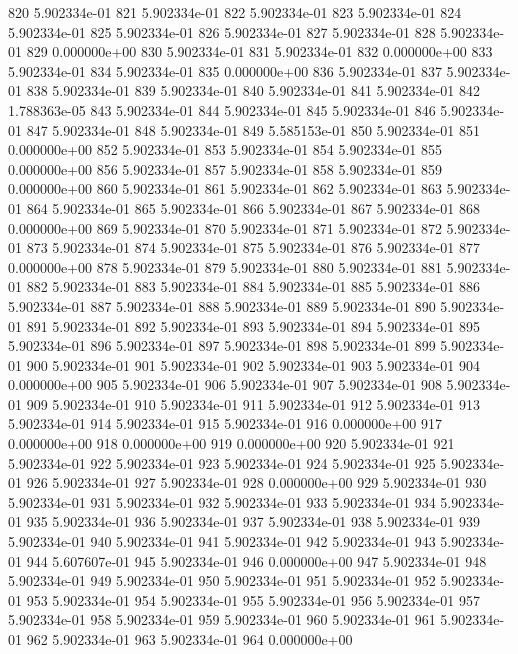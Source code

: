 \documentclass{article}
\begin{document}
\begin{Schunk}
\begin{Soutput}
820  5.902334e-01
821  5.902334e-01
822  5.902334e-01
823  5.902334e-01
824  5.902334e-01
825  5.902334e-01
826  5.902334e-01
827  5.902334e-01
828  5.902334e-01
829  0.000000e+00
830  5.902334e-01
831  5.902334e-01
832  0.000000e+00
833  5.902334e-01
834  5.902334e-01
835  0.000000e+00
836  5.902334e-01
837  5.902334e-01
838  5.902334e-01
839  5.902334e-01
840  5.902334e-01
841  5.902334e-01
842  1.788363e-05
843  5.902334e-01
844  5.902334e-01
845  5.902334e-01
846  5.902334e-01
847  5.902334e-01
848  5.902334e-01
849  5.585153e-01
850  5.902334e-01
851  0.000000e+00
852  5.902334e-01
853  5.902334e-01
854  5.902334e-01
855  0.000000e+00
856  5.902334e-01
857  5.902334e-01
858  5.902334e-01
859  0.000000e+00
860  5.902334e-01
861  5.902334e-01
862  5.902334e-01
863  5.902334e-01
864  5.902334e-01
865  5.902334e-01
866  5.902334e-01
867  5.902334e-01
868  0.000000e+00
869  5.902334e-01
870  5.902334e-01
871  5.902334e-01
872  5.902334e-01
873  5.902334e-01
874  5.902334e-01
875  5.902334e-01
876  5.902334e-01
877  0.000000e+00
878  5.902334e-01
879  5.902334e-01
880  5.902334e-01
881  5.902334e-01
882  5.902334e-01
883  5.902334e-01
884  5.902334e-01
885  5.902334e-01
886  5.902334e-01
887  5.902334e-01
888  5.902334e-01
889  5.902334e-01
890  5.902334e-01
891  5.902334e-01
892  5.902334e-01
893  5.902334e-01
894  5.902334e-01
895  5.902334e-01
896  5.902334e-01
897  5.902334e-01
898  5.902334e-01
899  5.902334e-01
900  5.902334e-01
901  5.902334e-01
902  5.902334e-01
903  5.902334e-01
904  0.000000e+00
905  5.902334e-01
906  5.902334e-01
907  5.902334e-01
908  5.902334e-01
909  5.902334e-01
910  5.902334e-01
911  5.902334e-01
912  5.902334e-01
913  5.902334e-01
914  5.902334e-01
915  5.902334e-01
916  0.000000e+00
917  0.000000e+00
918  0.000000e+00
919  0.000000e+00
920  5.902334e-01
921  5.902334e-01
922  5.902334e-01
923  5.902334e-01
924  5.902334e-01
925  5.902334e-01
926  5.902334e-01
927  5.902334e-01
928  0.000000e+00
929  5.902334e-01
930  5.902334e-01
931  5.902334e-01
932  5.902334e-01
933  5.902334e-01
934  5.902334e-01
935  5.902334e-01
936  5.902334e-01
937  5.902334e-01
938  5.902334e-01
939  5.902334e-01
940  5.902334e-01
941  5.902334e-01
942  5.902334e-01
943  5.902334e-01
944  5.607607e-01
945  5.902334e-01
946  0.000000e+00
947  5.902334e-01
948  5.902334e-01
949  5.902334e-01
950  5.902334e-01
951  5.902334e-01
952  5.902334e-01
953  5.902334e-01
954  5.902334e-01
955  5.902334e-01
956  5.902334e-01
957  5.902334e-01
958  5.902334e-01
959  5.902334e-01
960  5.902334e-01
961  5.902334e-01
962  5.902334e-01
963  5.902334e-01
964  0.000000e+00

\end{Soutput}
\end{Schunk}
\end{document}
